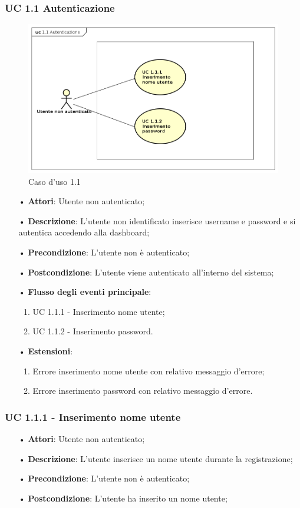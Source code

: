 \subsubsection{UC 1.1 Autenticazione}
\begin{figure}[H]
\centering
\includegraphics[width=17cm]{img/UC11.png} 
\caption{Caso d'uso 1.1}\label{fig:11}
\end{figure}
\begin{itemize}
\item[•]\textbf{Attori}: Utente non autenticato;
\item[•]\textbf{Descrizione}:  L’utente non identificato inserisce username e password e si autentica accedendo alla dashboard;
\item[•]\textbf{Precondizione}: L’utente non è autenticato;
\item[•]\textbf{Postcondizione}: L’utente viene autenticato all’interno del sistema;
\item[•]\textbf{Flusso degli eventi principale}:
\begin{enumerate}
\item UC 1.1.1 - Inserimento nome utente;
\item UC 1.1.2 - Inserimento password.
\end{enumerate}
\item[•]\textbf{Estensioni}:
\begin{enumerate}
\item Errore inserimento nome utente con relativo messaggio d’errore;
\item Errore inserimento password con relativo messaggio d’errore.
\end{enumerate}
\end{itemize}

\subsubsection{UC 1.1.1 - Inserimento nome utente}
\begin{itemize}
\item[•]\textbf{Attori}: Utente non autenticato;
\item[•]\textbf{Descrizione}: L’utente inserisce un nome utente durante la registrazione;
\item[•]\textbf{Precondizione}: L’utente non è autenticato;
\item[•]\textbf{Postcondizione}: L’utente ha inserito un nome utente;
\end{itemize}

